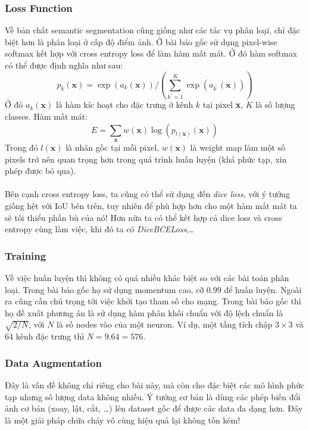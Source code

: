 \documentclass{article}
\begin{document}
\subsubsection{Loss Function}
Về bản chất semantic segmentation cũng giống như các tác vụ phân loại, chỉ đặc biệt hơn là phân loại ở cấp độ điểm ảnh. Ở bài báo gốc sử dụng pixel-wise softmax kết hợp với cross entropy loss để làm hàm mất mát. Ở đó hàm softmax có thể được định nghĩa như sau:
\begin{equation}
    p_k(\textbf{x}) = \exp{(a_k(\textbf{x}))}/\left( \sum_{k^{'} = 1}^{K} \exp{(a_{k^{'}}(\textbf{x}))} \right)
    \label{eq6}
\end{equation}
Ở đó $a_k(\textbf{x})$ là hàm kíc hoạt cho đặc trưng ở kênh $k$ tại pixel \textbf{x}, $K$ là số lượng classes. Hàm mất mát:
\begin{equation}
    E = \sum_{\textbf{x}} w(\textbf{x}) \log \left(p_{l(\textbf{x})}(\textbf{x}) \right)
    \label{eq7}
\end{equation}
Trong đó $l(\textbf{x})$ là nhãn gốc tại mỗi pixel, $w(\textbf{x})$ là weight map làm một số pixels trở nên quan trọng hơn trong quá trình huấn luyện (khá phức tạp, xin phép được bỏ qua).\\\\
Bên cạnh cross entropy loss, ta cũng có thể sử dụng đến \textit{dice loss}, với ý tưởng giống hệt với IoU bên trên, tuy nhiên để phù hợp hơn cho một hàm mất mát ta sẽ tối thiểu phần bù của nó! Hơn nữa ta có thể kết hợp cả dice loss và cross entropy cùng làm việc, khi đó ta có \textit{DiceBCELoss},\ldots 
\subsubsection{Training}
Về việc huấn luyện thì không có quá nhiều khác biệt so với các bài toán phân loại. Trong bài báo gốc họ sử dụng momentum cao, cỡ $0.99$ để huấn luyện. Ngoài ra cũng cần chú trọng tới việc khởi tạo tham số cho mạng. Trong bài báo gốc thì họ đề xuất phương án là sử dụng hàm phân khối chuẩn với độ lệch chuẩn là $\sqrt{2/N}$, với $N$ là số nodes vào của một neuron. Ví dụ, một tầng tích chập $3 \times 3$ và $64$ kênh đặc trưng thì $N = 9.64 = 576$.
\subsubsection{Data Augmentation}
Đây là vấn đề không chỉ riêng cho bài này, mà còn cho đặc biệt các mô hình phức tạp nhưng số lượng data không nhiều. Ý tưởng cơ bản là dùng các phép biến đổi ảnh cơ bản (xoay, lật, cắt, \ldots) lên dataset gốc để được các data đa dạng hơn. Đây là một giải pháp chữa cháy vô cùng hiệu quả lại không tốn kém!  
\end{document}
